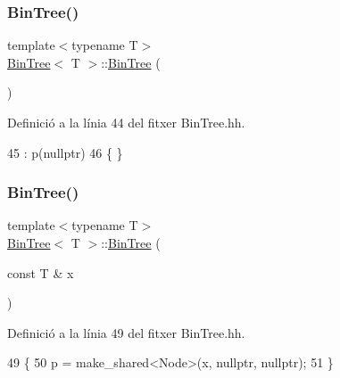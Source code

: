 \subsubsection{\texorpdfstring{Bin\+Tree()}{BinTree()}\hspace{0.1cm}{\footnotesize\ttfamily [1/3]}}
{\footnotesize\ttfamily template$<$typename T$>$ \\
\hyperlink{class_bin_tree}{Bin\+Tree}$<$ T $>$\+::\hyperlink{class_bin_tree}{Bin\+Tree} (\begin{DoxyParamCaption}{ }\end{DoxyParamCaption})}



Definició a la línia 44 del fitxer Bin\+Tree.\+hh.


\begin{DoxyCode}
45     :   p(\textcolor{keyword}{nullptr})
46     \{   \}
\end{DoxyCode}
\mbox{\label{class_bin_tree_a1ab686e0bcf990093ff91fe71744c1a4}} 
\subsubsection{\texorpdfstring{Bin\+Tree()}{BinTree()}\hspace{0.1cm}{\footnotesize\ttfamily [2/3]}}
{\footnotesize\ttfamily template$<$typename T$>$ \\
\hyperlink{class_bin_tree}{Bin\+Tree}$<$ T $>$\+::\hyperlink{class_bin_tree}{Bin\+Tree} (\begin{DoxyParamCaption}\item[{const T \&}]{x }\end{DoxyParamCaption})\hspace{0.3cm}{\ttfamily [explicit]}}



Definició a la línia 49 del fitxer Bin\+Tree.\+hh.


\begin{DoxyCode}
49                                   \{
50         p = make\_shared<Node>(x, \textcolor{keyword}{nullptr}, \textcolor{keyword}{nullptr});
51     \}
\end{DoxyCode}
\mbox{\label{class_bin_tree_adb7eeff76d08130c943b36af215eb521}} 
